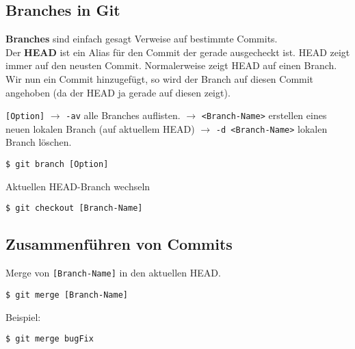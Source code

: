 \documentclass[a4paper,8pt,landscape,twocolumn]{scrartcl}
\begin{document}
\subsection{Branches in Git}
\textbf{Branches} sind einfach gesagt Verweise auf bestimmte Commits.\\
Der \textbf{HEAD} ist ein Alias für den Commit der gerade ausgecheckt ist. HEAD zeigt immer auf den neusten Commit. Normalerweise zeigt HEAD auf einen Branch. Wir nun ein Commit hinzugefügt, so wird der Branch auf diesen Commit angehoben (da der HEAD ja gerade auf diesen zeigt).
\begin{orangeBox}
\texttt{[Option]} $\rightarrow$ \texttt{-av} alle Branches auflisten. $\rightarrow$ \texttt{<Branch-Name>} erstellen eines neuen lokalen Branch (auf aktuellem HEAD) $\rightarrow$ \texttt{-d <Branch-Name>} lokalen Branch löschen.
\begin{lstlisting}[style=bash]
$ git branch [Option]
\end{lstlisting}
\end{orangeBox}

\begin{orangeBox}
Aktuellen HEAD-Branch wechseln
\begin{lstlisting}[style=bash]
$ git checkout [Branch-Name]
\end{lstlisting}
\end{orangeBox}


\subsection{Zusammenführen von Commits}
\begin{orangeBox}
Merge von \texttt{[Branch-Name]} in den aktuellen HEAD.
\begin{lstlisting}[style=bash]
$ git merge [Branch-Name]
\end{lstlisting}
Beispiel:
\begin{lstlisting}[style=bash]
$ git merge bugFix
\end{lstlisting}

\end{orangeBox}
\end{document}
